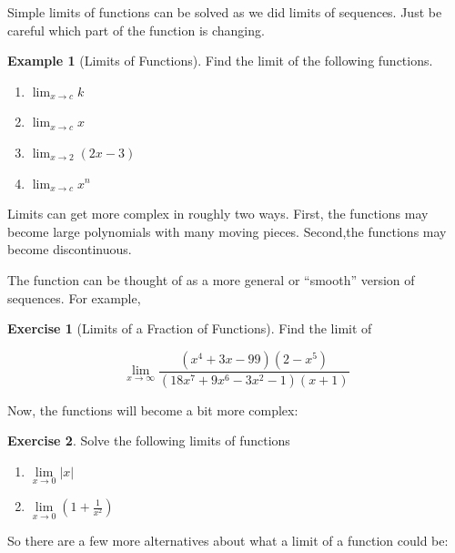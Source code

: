 \documentclass[
]{book}
\providecommand{\tightlist}{%
  \setlength{\itemsep}{0pt}\setlength{\parskip}{0pt}}
\theoremstyle{definition}
\theoremstyle{definition}
\newtheorem{example}{Example}[chapter]
\theoremstyle{definition}
\newtheorem{exercise}{Exercise}[chapter]
\theoremstyle{remark}
\begin{document}
Simple limits of functions can be solved as we did limits of sequences. Just be careful which part of the function is changing.

\begin{example}[Limits of Functions]
\protect\hypertarget{exm:limfun1}{}{\label{exm:limfun1} {} }Find the limit of the following functions.

\begin{enumerate}
\def\labelenumi{\arabic{enumi}.}
\tightlist
\item
  \(\lim_{x \to c} k\)
\item
  \(\lim_{x \to c} x\)
\item
  \(\lim_{x\to 2} (2x-3)\)
\item
  \(\lim_{x \to c} x^n\)
\end{enumerate}
\end{example}

Limits can get more complex in roughly two ways. First, the functions may become large polynomials with many moving pieces. Second,the functions may become discontinuous.

The function can be thought of as a more general or ``smooth'' version of sequences. For example,

\begin{exercise}[Limits of a Fraction of Functions]
\protect\hypertarget{exr:limfunmax}{}{\label{exr:limfunmax} {} }
Find the limit of

\[\lim_{x\to\infty} \frac{(x^4 +3x−99)(2−x^5)}{(18x^7 +9x^6 −3x^2 −1)(x+1)}\]
\end{exercise}

Now, the functions will become a bit more complex:

\begin{exercise}
\protect\hypertarget{exr:discontlim}{}{\label{exr:discontlim} }Solve the following limits of functions

\begin{enumerate}
\def\labelenumi{\arabic{enumi}.}
\tightlist
\item
  \(\lim\limits_{x\to 0} |x|\)
\item
  \(\lim\limits_{x\to 0} \left(1+\frac{1}{x^2}\right)\)
\end{enumerate}
\end{exercise}

So there are a few more alternatives about what a limit of a function could be:
\end{document}
